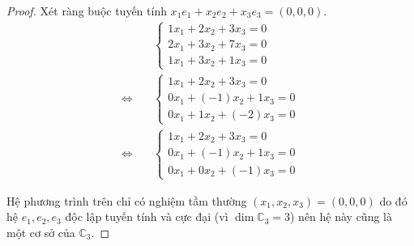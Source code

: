 \documentclass[class=linearalgebra,crop=false]{standalone}
\begin{document}
\begin{proof}Xét ràng buộc tuyến tính $x_{1}e_{1} + x_{2}e_{2} + x_{3}e_{3} = (0, 0, 0)$.
    \begin{align*}
                             & \begin{cases}
                                   1x_{1} + 2x_{2} + 3x_{3} = 0 \\
                                   2x_{1} + 3x_{2} + 7x_{3} = 0 \\
                                   1x_{1} + 3x_{2} + 1x_{3} = 0
                               \end{cases} \\
        \Leftrightarrow\quad &
        \begin{cases}
            1x_{1} + 2x_{2} + 3x_{3} = 0    \\
            0x_{1} + (-1)x_{2} + 1x_{3} = 0 \\
            0x_{1} + 1x_{2} + (-2)x_{3} = 0
        \end{cases}                     \\
        \Leftrightarrow\quad &
        \begin{cases}
            1x_{1} + 2x_{2} + 3x_{3} = 0    \\
            0x_{1} + (-1)x_{2} + 1x_{3} = 0 \\
            0x_{1} + 0x_{2} + (-1)x_{3} = 0
        \end{cases}
    \end{align*}
    \par Hệ phương trình trên chỉ có nghiệm tầm thường $(x_{1}, x_{2}, x_{3}) = (0, 0, 0)$ do đó hệ $e_{1}, e_{2}, e_{3}$ độc lập tuyến tính và cực đại (vì $\dim\mathbb{C}_{3} = 3$) nên hệ này cũng là một cơ sở của $\mathbb{C}_{3}$.


\end{proof}
\end{document}
